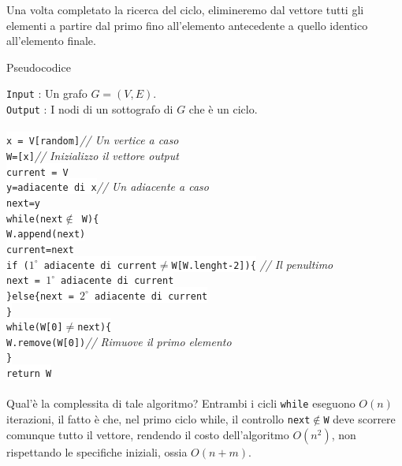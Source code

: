 \documentclass[12pt, letterpaper]{article}
\newcommand{\code}[1]{\colorbox{light-gray}{\texttt{#1}}}
\newcommand{\codee}[1]{\colorbox{white}{\texttt{#1}}}
\newcommand{\acc}{\\\hphantom{}\\}
\begin{document}
Una volta completato la ricerca del ciclo, elimineremo dal vettore tutti gli elementi a partire dal primo 
fino all'elemento antecedente a quello identico all'elemento finale. \begin{center}
    Pseudocodice 
\end{center}
\code{Input} : Un grafo $G=(V,E)$.\\
\code{Output} : I nodi di un sottografo di \(G\) che è un ciclo.\\\hphantom{}\\
\hphantom{ident}\codee{x = V[random]}\color{lg}\textit{// Un vertice a caso}\color{black}\\
\hphantom{ident}\codee{W=[x]}\color{lg}\textit{// Inizializzo il vettore output}\color{black}\\
\hphantom{ident}\codee{current = V}\\
\hphantom{ident}\codee{y=adiacente di x}\color{lg}\textit{// Un adiacente a caso}\color{black}\\
\hphantom{ident}\codee{next=y}\\
\hphantom{ident}\codee{while(next$\notin$ W)\{}\\
\hphantom{ident}\hphantom{ident}\codee{W.append(next)}\\
\hphantom{ident}\hphantom{ident}\codee{current=next}\\
\hphantom{ident}\hphantom{ident}\codee{if ($1^\circ$ adiacente di current$\ne$W[W.lenght-2])\{}
\color{lg}\textit{// Il penultimo}\color{black}\\
\hphantom{ident}\hphantom{ident}\hphantom{ident}\codee{next = $1^\circ$ adiacente di current}\\
\hphantom{ident}\hphantom{ident}\codee{\}else\{next = $2^\circ$ adiacente di current}\\
\hphantom{ident}\codee{\}}\\
\hphantom{ident}\codee{while(W[0]$\ne$next)\{}\\
\hphantom{ident}\hphantom{ident}\codee{W.remove(W[0])}\color{lg}\textit{// Rimuove il primo elemento}\color{black}\\
\hphantom{ident}\codee{\}}\\
\hphantom{ident}\codee{return W}\acc 
Qual'è la complessita di tale algoritmo? Entrambi i cicli \code{while} eseguono \(O(n)\) iterazioni, il 
fatto è che, nel primo ciclo while, il controllo \code{next$\notin$W} deve scorrere comunque tutto il vettore, 
rendendo il costo dell'algoritmo \(O(n^2)\), non rispettando le specifiche iniziali, ossia \(O(n+m)\).
\end{document}
